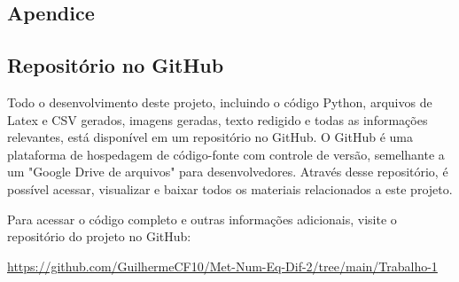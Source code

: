 \begin{titlepage}

    \section{Apendice}

    \subsection{Repositório no GitHub}

    Todo o desenvolvimento deste projeto, incluindo o código Python, arquivos de Latex e CSV gerados, imagens geradas, texto redigido e todas as informações relevantes, está disponível em um repositório no GitHub. O GitHub é uma plataforma de hospedagem de código-fonte com controle de versão, semelhante a um "Google Drive de arquivos" para desenvolvedores. Através desse repositório, é possível acessar, visualizar e baixar todos os materiais relacionados a este projeto.

    Para acessar o código completo e outras informações adicionais, visite o repositório do projeto no GitHub:
    \begin{center}
        \url{https://github.com/GuilhermeCF10/Met-Num-Eq-Dif-2/tree/main/Trabalho-1}
    \end{center}


    

\end{titlepage}
